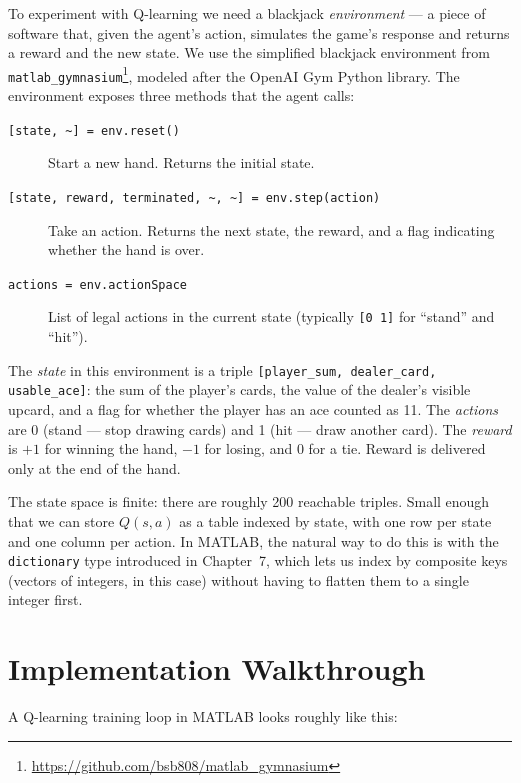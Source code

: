 \documentclass[../../book.tex]{subfiles}
\begin{document}
To experiment with Q-learning we need a blackjack \emph{environment} --- a piece of software that, given the agent's action, simulates the game's response and returns a reward and the new state.  We use the simplified blackjack environment from \texttt{matlab\_gymnasium}\footnote{\url{https://github.com/bsb808/matlab_gymnasium}}, modeled after the OpenAI Gym Python library.  The environment exposes three methods that the agent calls:

\begin{description}
    \item[\lstinline{[state, ~] = env.reset()}] Start a new hand. Returns the initial state.
    \item[\lstinline{[state, reward, terminated, ~, ~] = env.step(action)}] Take an action.  Returns the next state, the reward, and a flag indicating whether the hand is over.
    \item[\lstinline{actions = env.actionSpace}] List of legal actions in the current state (typically \lstinline{[0 1]} for ``stand'' and ``hit'').
\end{description}

The \emph{state} in this environment is a triple \lstinline{[player_sum, dealer_card, usable_ace]}: the sum of the player's cards, the value of the dealer's visible upcard, and a flag for whether the player has an ace counted as 11.  The \emph{actions} are 0 (stand --- stop drawing cards) and 1 (hit --- draw another card).  The \emph{reward} is $+1$ for winning the hand, $-1$ for losing, and $0$ for a tie.  Reward is delivered only at the end of the hand.

The state space is finite: there are roughly 200 reachable triples.  Small enough that we can store $Q(s, a)$ as a table indexed by state, with one row per state and one column per action.  In MATLAB, the natural way to do this is with the \lstinline{dictionary} type introduced in Chapter~7, which lets us index by composite keys (vectors of integers, in this case) without having to flatten them to a single integer first.

\section{Implementation Walkthrough}

A Q-learning training loop in MATLAB looks roughly like this:
\end{document}
